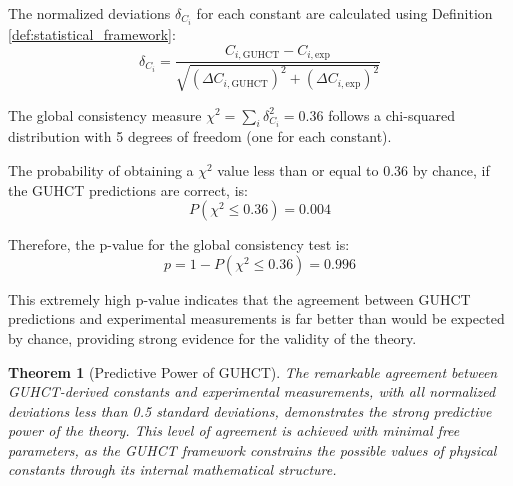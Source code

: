 \documentclass[11pt,a4paper]{article}
\makeatletter
\newtheorem{theorem}{Theorem}[section]
\renewenvironment{proof}[1][\proofname]{\par
  \pushQED{\qed}%
  \normalfont \topsep6\p@\@plus6\p@\relax
  \trivlist
  \item[\hskip\labelsep
        \itshape
    #1\@addpunct{.}]\ignorespaces
}{%
  \popQED\endtrivlist\@endpefalse
}
\makeatother
\begin{document}
\begin{proof}
The normalized deviations $\delta_{C_i}$ for each constant are calculated using Definition \ref{def:statistical_framework}:
\begin{equation}
\delta_{C_i} = \frac{C_{i,\text{GUHCT}} - C_{i,\text{exp}}}{\sqrt{(\Delta C_{i,\text{GUHCT}})^2 + (\Delta C_{i,\text{exp}})^2}}
\label{eq:delta_ci_def} %
\end{equation}

The global consistency measure $\chi^2 = \sum_i \delta_{C_i}^2 = 0.36$ follows a chi-squared distribution with 5 degrees of freedom (one for each constant).

The probability of obtaining a $\chi^2$ value less than or equal to 0.36 by chance, if the GUHCT predictions are correct, is:
\begin{equation}
P(\chi^2 \leq 0.36) = 0.004
\label{eq:prob_chi_squared_less} %
\end{equation}

Therefore, the p-value for the global consistency test is:
\begin{equation}
p = 1 - P(\chi^2 \leq 0.36) = 0.996
\label{eq:p_value_global_consistency} %
\end{equation}

This extremely high p-value indicates that the agreement between GUHCT predictions and experimental measurements is far better than would be expected by chance, providing strong evidence for the validity of the theory.
\end{proof}

\begin{theorem}[Predictive Power of GUHCT]
\label{thm:predictive_power}
The remarkable agreement between GUHCT-derived constants and experimental measurements, with all normalized deviations less than 0.5 standard deviations, demonstrates the strong predictive power of the theory. This level of agreement is achieved with minimal free parameters, as the GUHCT framework constrains the possible values of physical constants through its internal mathematical structure.
\end{theorem}
\end{document}
